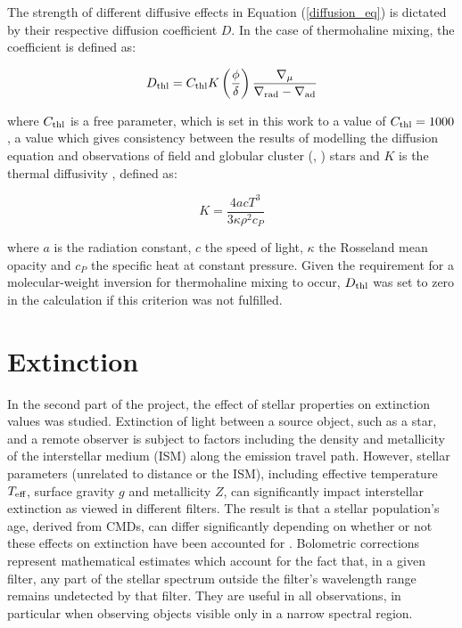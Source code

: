 \documentclass[12pt, a4paper]{report}
\begin{document}
The strength of different diffusive effects in Equation (\ref{diffusion_eq}) is dictated by their respective diffusion coefficient $D$. In the case of thermohaline mixing, the coefficient is defined \citep{2010A&A...521A...9C} as:

\begin{equation}
D_{\textnormal{thl}} = C_{\textnormal{thl}} K \left( \frac{\phi}{\delta} \right) \frac{\nabla _{\mu}}{\nabla _{\textnormal{rad}} - \nabla _{\textnormal{ad}}}
\label{Dthl_def}
\end{equation}

where $C_{\textnormal{thl}}$ is a free parameter, which is set in this work to a value of $C_{\textnormal{thl}} = 1000$, a value which gives consistency between the results of modelling the diffusion equation and observations of field \citep{2007A&A...467L..15C} and globular cluster (\cite{2011ApJ...728...79A}, \cite{2012ApJ...749..128A}) stars and $K$ is the thermal diffusivity \citep{2017RSOS....470192S}, defined as:

\begin{equation}
K = \frac{4acT^{3}}{3\kappa\rho ^{2}c_{P}}
\label{diffusivity_def}
\end{equation}

where $a$ is the radiation constant, $c$ the speed of light, $\kappa$ the Rosseland mean opacity and $c_{P}$ the specific heat at constant pressure. Given the requirement for a molecular-weight inversion for thermohaline mixing to occur, $D_{\textnormal{thl}}$ was set to zero in the calculation if this criterion was not fulfilled.

\section{Extinction}
In the second part of the project, the effect of stellar properties on extinction values was studied. Extinction of light between a source object, such as a star, and a remote observer is subject to factors including the density and metallicity of the interstellar medium (ISM) along the emission travel path. However, stellar parameters (unrelated to distance or the ISM), including effective temperature $T_{\textnormal{eff}}$, surface gravity $g$ and metallicity $Z$, can significantly impact interstellar extinction as viewed in different filters. The result is that a stellar population's age, derived from CMDs,  can differ significantly depending on whether or not these effects on extinction have been accounted for \citep{2017Galax...5...28O}. Bolometric corrections represent mathematical estimates which account for the fact that, in a given filter, any part of the stellar spectrum outside the filter's wavelength range remains undetected by that filter. They are useful in all observations, in particular when observing objects visible only in a narrow spectral region.
\end{document}

